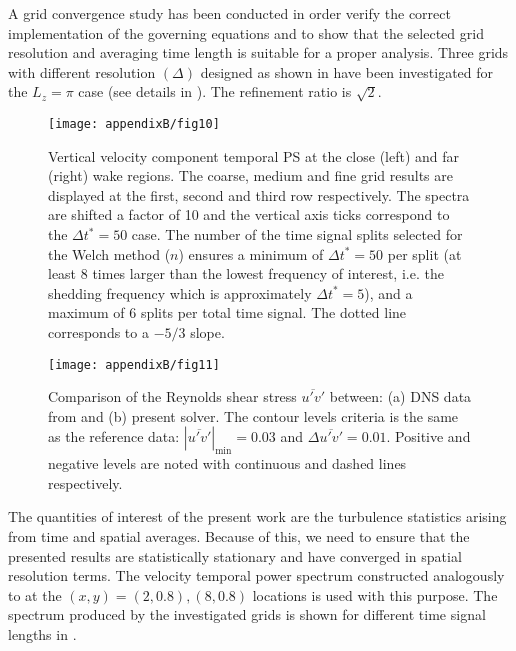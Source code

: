 \documentclass[../main.tex]{subfiles}
\begin{document}
A grid convergence study has been conducted in order verify the correct implementation of the governing equations and to show that the selected grid resolution and averaging time length is suitable for a proper analysis.
Three grids with different resolution $(\Delta)$ designed as shown in  have been investigated for the $L_z=\pi$ case (see details in ).
The refinement ratio is $\sqrt{2}$.

\begin{figure}
  \centerline{\texttt{[image: appendixB/fig10]}}
  \caption{Vertical velocity component temporal PS at the close (left) and far (right) wake regions.
The coarse, medium and fine grid results are displayed at the first, second and third row respectively.
The spectra are shifted a factor of 10 and the vertical axis ticks correspond to the $\Delta t^*=50$ case.
The number of the time signal splits selected for the Welch method ($n$) ensures a minimum of $\Delta t^*=50$ per split (at least 8 times larger than the lowest frequency of interest, i.e. the shedding frequency which is approximately $\Delta t^*=5$), and a maximum of 6 splits per total time signal.
The dotted line corresponds to a $-5/3$ slope.}
\label{fig:velocity_spectras_GC}
\end{figure}

\begin{figure}
  \centerline{\texttt{[image: appendixB/fig11]}}
  \caption{Comparison of the Reynolds shear stress $\overline{u'v'}$ between: (a) DNS data from \cite{Dong2005} and (b) present solver.
The contour levels criteria is the same as the reference data: ${|\overline{u'v'}|}_{\mathrm{min}}=0.03$ and $\Delta\overline{u'v'}=0.01$.
Positive and negative levels are noted with continuous and dashed lines respectively.}
\label{fig:uv_validation}
\end{figure}

The quantities of interest of the present work are the turbulence statistics arising from time and spatial averages.
Because of this, we need to ensure that the presented results are statistically stationary and have converged in spatial resolution terms.
The velocity temporal power spectrum constructed analogously to  at the $(x,y)=\left(2,0.8\right),\left(8,0.8\right)$ locations is used with this purpose.
The spectrum produced by the investigated grids is shown for different time signal lengths in .
\end{document}
